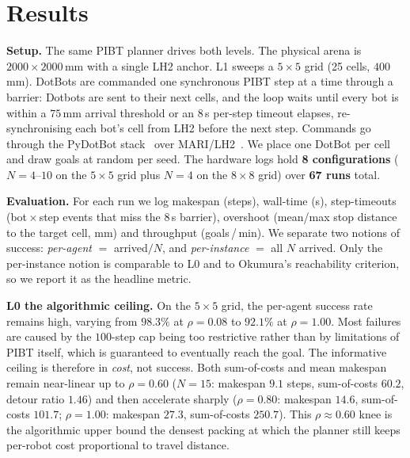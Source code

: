 \documentclass[sigconf, 9pt, nonacm]{acmart}
\begin{document}
\section{Results}
\label{sec:results}
  
\textbf{Setup.}
 The same PIBT planner drives both levels. The physical arena is $2000\times2000$\,mm
  with a single LH2 anchor. L1 sweeps a $5\times5$ grid (25 cells, $400$\,mm). 
  DotBots are commanded one synchronous PIBT step at a time through a barrier:
  Dotbots are sent to their next cells, and the loop waits until every bot
  is within a $75$\,mm arrival threshold or an $8$\,s per-step timeout 
  elapses, re-synchronising each bot's cell from LH2 before the next step.
  Commands go through the PyDotBot stack~\cite{abadie24qrkey} over MARI/LH2~\cite{alvarado24dotbot}.
  We place one DotBot per cell and draw goals at random per seed. The
  hardware logs hold \textbf{8 configurations} ($N=4$--$10$ on the $5\times5$ grid plus
  $N=4$ on the $8\times8$ grid) over \textbf{67 runs} total.

  \textbf{Evaluation.}
  For each run we log makespan (steps), wall-time (s), step-timeouts
  (bot\,$\times$\,step events that miss the $8$\,s barrier), overshoot (mean/max stop
  distance to the target cell, mm) and throughput (goals\,/\,min). We separate two notions
  of success: \emph{per-agent} $=$ arrived$/N$, and \emph{per-instance} $=$ all $N$ arrived.
  Only the per-instance notion is comparable to L0 and to Okumura's reachability criterion,
  so we report it as the headline metric.

\textbf{L0 the algorithmic ceiling.}
On the $5 \times 5$ grid, the per-agent success rate remains high, varying from
$98.3\%$ at $\rho = 0.08$ to $92.1\%$ at $\rho = 1.00$. Most failures are 
caused by the $100$-step cap being too restrictive rather than by limitations 
of PIBT itself, which is guaranteed to eventually reach the goal. The informative ceiling 
is therefore in \emph{cost}, not success. Both sum-of-costs and mean makespan remain
near-linear up to $\rho=0.60$ ($N=15$: makespan $9.1$ steps, sum-of-costs $60.2$, detour
ratio $1.46$) and then accelerate sharply ($\rho=0.80$: makespan $14.6$, sum-of-costs
$101.7$; $\rho=1.00$: makespan $27.3$, sum-of-costs $250.7$). This $\rho\approx0.60$ knee
is the algorithmic upper bound the densest packing at which the planner still keeps
per-robot cost proportional to travel distance.
\end{document}
